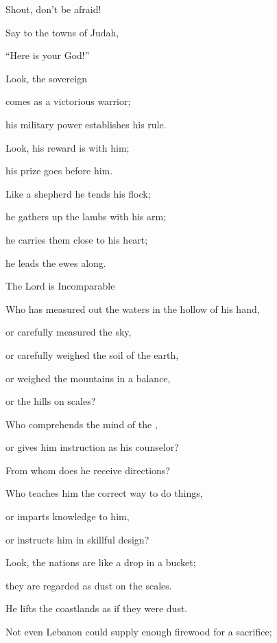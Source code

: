 {\par }{\Q Shout, don’t
be afraid!
\par }{\Q Say
to the towns
of Judah,
\par }{\Q “Here
is your God!”
\par }{\Q {}Look,
the sovereign

{}
comes
as a victorious
warrior;

\par }{\Q his military power
establishes his rule.
\par }{\Q Look,
his reward
is with
him;
\par }{\Q his prize
goes before him.
\par }{\Q {}Like a shepherd
he tends his flock;
\par }{\Q he gathers up
the lambs
with his arm;
\par }{\Q he carries
them close to his heart;

\par }{\Q he leads
the ewes along.
\par }{\SH The Lord is Incomparable
\par }{\Q {}Who
has measured
out the waters
in the hollow of his hand,
\par }{\Q or carefully measured
the sky,
\par }{\Q or carefully weighed
the soil
of the earth,
\par }{\Q or weighed
the mountains
in a balance,
\par }{\Q or the hills
on scales?
\par }{\Q {}Who
comprehends
the mind
of the {},
\par }{\Q or gives him
instruction as his counselor?
\par }{\Q {}From whom
does he receive directions?

\par }{\Q Who teaches
him the correct
way
to do things,

\par }{\Q or imparts
knowledge
to him,
\par }{\Q or instructs
him in skillful
design?
\par }{\Q {}Look,
the nations
are like a drop
in a bucket;
\par }{\Q they are regarded
as dust
on the scales.
\par }{\Q He lifts
the coastlands
as
if they were dust.
\par }{\Q {}Not
even Lebanon
could supply
enough
firewood
for a sacrifice;

}
